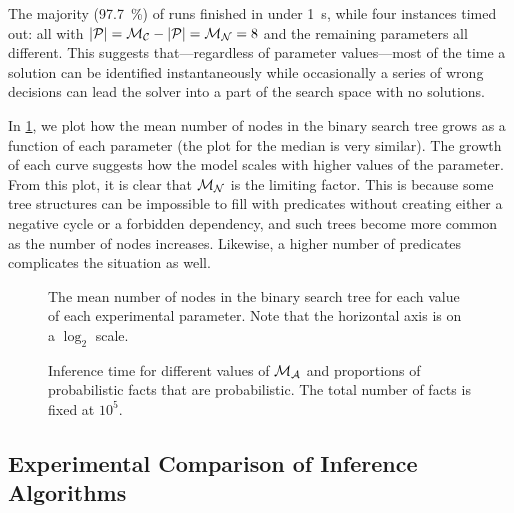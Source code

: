 The majority (\SI{97.7}{\percent}) of runs finished in under \SI{1}{\second},
while four instances timed out: all with $|\mathcal{P}{}| = \mathcal{M}_{\mathcal{C}}{} -
|\mathcal{P}{}| = \mathcal{M}_{\mathcal{N}}{} = 8$ and the remaining parameters all
different. This suggests that---regardless of parameter values---most of the
time a solution can be identified instantaneously while occasionally a series of
wrong decisions can lead the solver into a part of the search space with no
solutions.

In \cref{fig:impact}, we plot how the mean number of nodes in the binary search
tree grows as a function of each parameter (the plot for the median is very
similar). The growth of each curve suggests how the model scales with higher
values of the parameter. From this plot, it is clear that $\mathcal{M}_{\mathcal{N}}{}$ is
the limiting factor. This is because some tree structures can be impossible to
fill with predicates without creating either a negative cycle or a forbidden
dependency, and such trees become more common as the number of nodes increases.
Likewise, a higher number of predicates complicates the situation as well.

\begin{figure}[t]
  \centering
  \caption{The mean number of nodes in the binary search tree for each value of
    each experimental parameter. Note that the horizontal axis is on a $\log_2$
    scale.}\label{fig:impact}
\end{figure}

\begin{figure}[t]
  \centering
  \caption{Inference time for different values of $\mathcal{M}_{\mathcal{A}}{}$ and proportions
    of probabilistic facts that are probabilistic. The total number of facts is
    fixed at $10^5$.}\label{fig:bars}
\end{figure}

\subsection{Experimental Comparison of Inference
  Algorithms}\label{sec:1experiment2}

